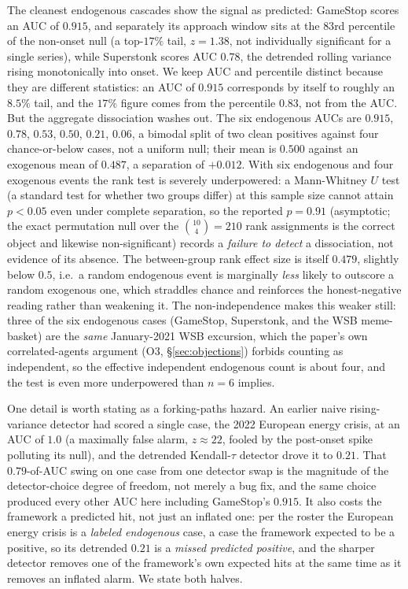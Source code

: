 \documentclass[11pt]{article}
\begin{document}
The cleanest endogenous cascades show the signal as predicted: GameStop scores an AUC of $0.915$, and separately its approach window sits at the $83$rd percentile of the non-onset null (a top-$17\%$ tail, $z=1.38$, not individually significant for a single series), while Superstonk scores AUC $0.78$, the detrended rolling variance rising monotonically into onset. We keep AUC and percentile distinct because they are different statistics: an AUC of $0.915$ corresponds by itself to roughly an $8.5\%$ tail, and the $17\%$ figure comes from the percentile $0.83$, not from the AUC. But the aggregate dissociation washes out. The six endogenous AUCs are $0.915$, $0.78$, $0.53$, $0.50$, $0.21$, $0.06$, a bimodal split of two clean positives against four chance-or-below cases, not a uniform null; their mean is $0.500$ against an exogenous mean of $0.487$, a separation of $+0.012$. With six endogenous and four exogenous events the rank test is severely underpowered: a Mann-Whitney $U$ test (a standard test for whether two groups differ) at this sample size cannot attain $p<0.05$ even under complete separation, so the reported $p=0.91$ (asymptotic; the exact permutation null over the $\binom{10}{4}=210$ rank assignments is the correct object and likewise non-significant) records a \emph{failure to detect} a dissociation, not evidence of its absence. The between-group rank effect size is itself $0.479$, slightly below $0.5$, i.e.\ a random endogenous event is marginally \emph{less} likely to outscore a random exogenous one, which straddles chance and reinforces the honest-negative reading rather than weakening it. The non-independence makes this weaker still: three of the six endogenous cases (GameStop, Superstonk, and the WSB meme-basket) are the \emph{same} January-2021 WSB excursion, which the paper's own correlated-agents argument (O3, \S\ref{sec:objections}) forbids counting as independent, so the effective independent endogenous count is about four, and the test is even more underpowered than $n=6$ implies.

One detail is worth stating as a forking-paths hazard. An earlier naive rising-variance detector had scored a single case, the 2022 European energy crisis, at an AUC of $1.0$ (a maximally false alarm, $z\approx 22$, fooled by the post-onset spike polluting its null), and the detrended Kendall-$\tau$ detector drove it to $0.21$. That $0.79$-of-AUC swing on one case from one detector swap is the magnitude of the detector-choice degree of freedom, not merely a bug fix, and the same choice produced every other AUC here including GameStop's $0.915$. It also costs the framework a predicted hit, not just an inflated one: per the roster the European energy crisis is a \emph{labeled endogenous} case, a case the framework expected to be a positive, so its detrended $0.21$ is a \emph{missed predicted positive}, and the sharper detector removes one of the framework's own expected hits at the same time as it removes an inflated alarm. We state both halves.
\end{document}
